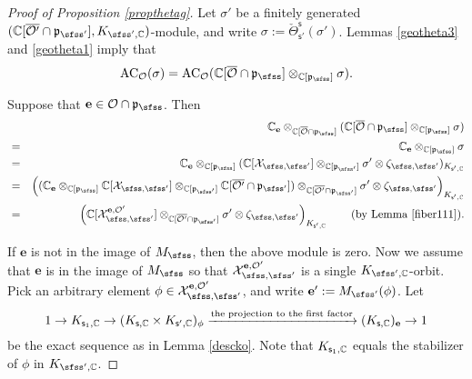 \documentclass[12pt,a4paper]{amsart}
\newcommand{\CO}{{\mathcal {O}}}
\newcommand{\CX}{{\mathcal {X}}}
\newcommand{\p}{\mathfrak p}
\numberwithin{equation}{section}
\theoremstyle{remark}
\begin{document}
\begin{proof}[Proof of Proposition \ref{propthetag}]
Let  $\sigma'$ be a finitely generated  $(\C[\overline{\CO'}\cap \p_{\sfss'}], K_{\sfss', \C})$-module, and write  $\sigma:=\check \Theta_{\mathsf s'}^{\mathsf s}(\sigma')$.
 Lemmas \ref{geotheta3} and \ref{geotheta1} imply that
\[
  \mathrm{AC}_{\CO}(\sigma)=\mathrm{AC}_{\CO}(\C[\overline \CO\cap \p_{\sfss}]\otimes_{\C[\p_{\sfss}]} \sigma).
\]

Suppose that $\mathbf e\in \CO\cap \p_\sfss$. Then
\begin{eqnarray*}
  && \C_\mathbf e \otimes_{\C[\overline \CO\cap \p_{\sfss}]} (\C[\overline \CO\cap \p_{\sfss}]\otimes_{\C[\p_{\sfss}]} \sigma)\\
  &=&  \C_\mathbf e \otimes_{\C[\p_{\sfss}]} \sigma\\
  &=&  \C_\mathbf e \otimes_{\C[\p_{\sfss}]} (\C[\CX_{\sfss, \sfss'}]\otimes_{\C[\p_{\sfss'}]} \sigma'\otimes \zeta_{\sfss, \sfss'})_{K_{\mathsf s', \C}} \\  
   &=&\left( (\C_\mathbf e \otimes_{\C[\p_{\sfss}]} \C[\CX_{\sfss, \sfss'}]\otimes_{\C[\p_{\sfss'}]} \C[\overline{\CO'}\cap \p_{\sfss'}]) \otimes_{\C[\overline{\CO'}\cap \p_{\sfss'}]}\sigma'\otimes \zeta_{\sfss, \sfss'}\right)_{K_{\mathsf s', \C}} \\  
      &=&\left( \C[\CX_{\sfss, \sfss'}^{\mathbf e, \CO'}] \otimes_{\C[\overline{\CO'}\cap \p_{\sfss'}]}\sigma'\otimes \zeta_{\sfss, \sfss'}\right)_{K_{\mathsf s', \C}} \qquad (\textrm{by Lemma \ref{fiber111}}).
\end{eqnarray*}

If $\mathbf e$ is not in the image of $M_\sfss$, then the above module is zero. Now we assume that $\mathbf e$ is in the image of $M_\sfss$ so that $\CX_{\sfss, \sfss'}^{\mathbf e, \CO'}$ is a single $K_{\sfss',\C}$-orbit. Pick an arbitrary element $\phi\in \CX_{\sfss, \sfss'}^{\mathbf e, \CO'}$, and write $\mathbf e':=M_{\sfss'}(\phi)$. Let 
\[
  1\rightarrow K_{\mathsf s_1,\mathbb{C}}\rightarrow (K_{\mathsf s,\mathbb{C}}\times K_{\mathsf s', \mathbb{C}})_\phi\xrightarrow{\textrm{the projection to the first factor}} (K_{\mathsf s,\mathbb{C}})_{\mathbf e}\rightarrow 1
\]
be the exact  sequence as in Lemma \ref{descko}. Note that $ K_{\mathsf s_1,\mathbb{C}}$ equals the stabilizer of $\phi$ in $K_{\sfss', \C}$. 



\end{proof}
\end{document}
